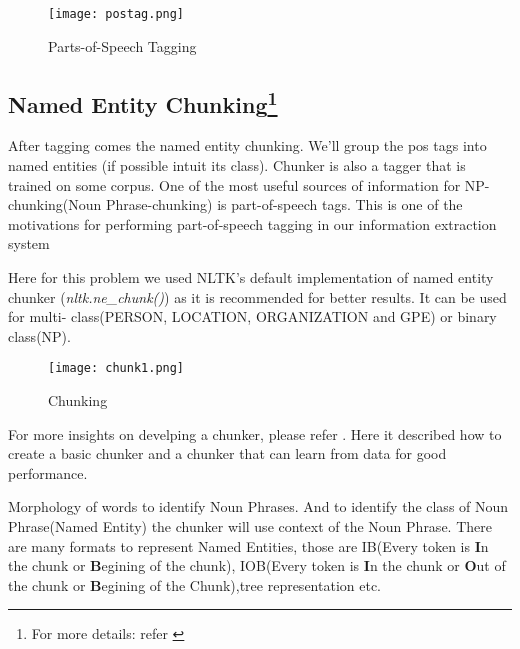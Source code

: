 \documentclass[12pt]{report}
\begin{document}
\begin{figure}[htp]
\centering
\texttt{[image: postag.png]}
\caption{Parts-of-Speech Tagging}
\label{pos}
\end{figure}

\subsection{Named Entity Chunking\footnote{For more details: refer \cite{BookIE}}}
\par After tagging comes the named entity chunking. We'll group the pos tags into named
 entities (if possible intuit its class). Chunker is also a tagger that is trained on some
  corpus.
One of the most useful sources of information for NP-chunking(Noun Phrase-chunking) is part-of-speech tags.
This is one of the motivations for performing part-of-speech tagging in our information extraction system
\par Here for this problem we used NLTK's default implementation of named entity chunker
(\textit{nltk.ne\_chunk()}) as it is recommended for better results. It can be used for multi-
class(PERSON, LOCATION, ORGANIZATION and GPE) or binary class(NP).

\begin{figure}[htp]
\centering
\texttt{[image: chunk1.png]}
\caption{Chunking}
\label{Chunk}
\end{figure}

\par For more insights on develping a chunker, please refer \cite{BookIE}. Here it described
 how to create a basic chunker and a chunker that can learn from data for good performance.
\par Morphology of words to identify Noun Phrases. And to identify the class of Noun Phrase(Named Entity) the chunker will use context of the Noun Phrase.
There are many formats to represent Named Entities, those are IB(Every token is \textbf{I}n the chunk or \textbf{B}egining of the chunk), IOB(Every token is \textbf{I}n the chunk or \textbf{O}ut of the chunk or \textbf{B}egining of the Chunk),tree representation etc.
\end{document}
